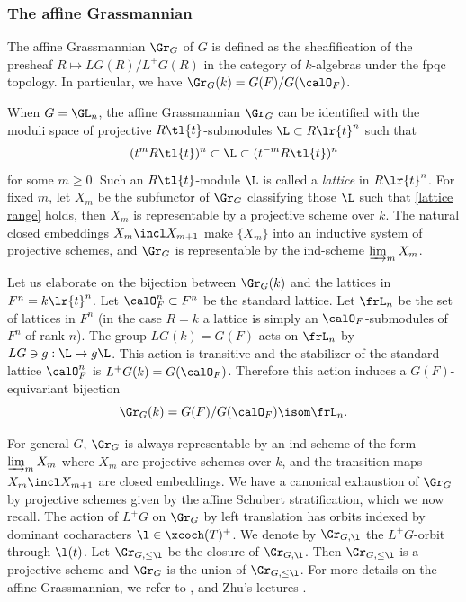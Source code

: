 \subsubsection{The affine Grassmannian}\label{sss:Gr} The affine Grassmannian $\Gr_{G}$ of $G$ is defined as the sheafification of the presheaf $R\mapsto LG(R)/L^{+}G(R)$ in the category of $k$-algebras under the fpqc topology.
In particular, we have $\Gr_{G}(k)=G(F)/G(\calO_{F})$. 

When $G=\GL_{n}$, the affine Grassmannian $\Gr_{G}$ can be identified with the moduli space of projective $R\tl{t}$-submodules $\L\subset R\lr{t}^{n}$ such that
\begin{equation}\label{lattice range}
(t^{m}R\tl{t})^{n}\subset \L\subset (t^{-m}R\tl{t})^{n}
\end{equation}
for some $m\geq 0$. Such an $R\tl{t}$-module $\L$ is called a {\em lattice} in $R\lr{t}^{n}$.  For fixed $m$, let $X_{m}$ be the subfunctor of $\Gr_{G}$ classifying those $\L$ such that \eqref{lattice range} holds, then $X_{m}$ is representable by a projective scheme over $k$. The natural closed embeddings $X_{m}\incl X_{m+1}$ make $\{X_{m}\}$ into an inductive system of projective schemes, and $\Gr_{G}$ is representable by the ind-scheme $\varinjlim_{m}X_{m}$.

Let us elaborate on the bijection between $\Gr_{G}(k)$ and the lattices in $F^{n}=k\lr{t}^{n}$. Let $\calO_{F}^{n}\subset F^{n}$ be the standard lattice. Let $\frL_{n}$ be the set of lattices in $F^{n}$ (in the case $R=k$ a lattice is simply an $\calO_{F}$-submodules of $F^{n}$ of rank $n$). The group $LG(k)=G(F)$ acts on $\frL_{n}$ by $LG\ni g:\L\mapsto g\L$. This action is transitive and the stabilizer of the standard lattice $\calO^{n}_{F}$ is $L^{+}G(k)=G(\calO_{F})$. Therefore this action induces a $G(F)$-equivariant bijection
\begin{equation}\label{Gr lattices}
\Gr_{G}(k)=G(F)/G(\calO_{F})\isom \frL_{n}.
\end{equation}


For general $G$, $\Gr_{G}$ is always representable by an ind-scheme of the form $\varinjlim_{m}X_{m}$ where $X_{m}$ are projective schemes over $k$, and the transition maps $X_{m}\incl X_{m+1}$ are closed embeddings.  We have a canonical exhaustion of $\Gr_{G}$ by projective schemes given by the affine Schubert stratification, which we now recall. The action of $L^{+}G$ on $\Gr_{G}$ by left translation has orbits indexed by dominant cocharacters $\l\in\xcoch(T)^{+}$. We denote by $\Gr_{G,\l}$ the $L^{+}G$-orbit through $\l(t)$. Let $\Gr_{G,\leq \l}$ be the closure of $\Gr_{G,\l}$. Then $\Gr_{G,\leq\l}$ is a projective scheme and $\Gr_{G}$ is the union of $\Gr_{G,\leq\l}$. For more details on the affine Grassmannian, we refer to \cite[\S2]{BL}, \cite[\S2]{Faltings} and Zhu's lectures \cite{Zhu}.




